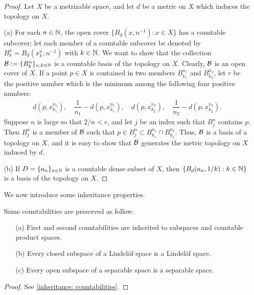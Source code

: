 \begin{proof}
    \hangindent=0.65cm
    Let $X$ be a metrizable space, and let $d$ be a metric on $X$ which induces the topology on $X$.

    \noindent(a)
    For each $n\in{\mathbb{N}}$, the open cover $\{B_d\left(x, n^{-1}\right): x\in X\}$ has a countable subcover; let each member of a countable subcover be denoted by $B_k^n=B_d(x_k^n, n^{-1})$ with $k\in{\mathbb{N}}$.
    We want to show that the collection ${\mathcal{B}}:=\{B_k^n\}_{n, k\in{\mathbb{N}}}$ is a countable basis of the topology on $X$.
    Clearly, ${\mathcal{B}}$ is an open cover of $X$.
    If a point $p\in X$ is contained in two members $B_{k_1}^{n_1}$ and $B_{k_2}^{n_2}$, let $r$ be the positive number which is the minimum among the following four positive numbers:
    \begin{align*}
        d(p, x_{k_1}^{n_1}),\quad\dfrac{1}{n_1}-d(p, x_{k_1}^{n_1}),\quad d(p, x_{k_2}^{n_2}),\quad\dfrac{1}{n_2}-d(p, x_{k_2}^{n_2}).
    \end{align*}
    Suppose $n$ is large so that $2/n<r$, and let $j$ be an index such that $B_j^n$ contains $p$.
    Then $B_j^n$ is a member of ${\mathcal{B}}$ such that $p\in B_j^n\subset B_{k_1}^{n_1}\cap B_{k_2}^{n_2}$.
    Thus, ${\mathcal{B}}$ is a basis of a topology on $X$, and it is easy to show that ${\mathcal{B}}$ generates the metric topology on $X$ induced by $d$.

    \noindent(b)
    If $D=\{a_n\}_{n\in{\mathbb{N}}}$ is a countable dense subset of $X$, then $\{B_d(a_n, 1/k): k\in{\mathbb{N}}\}$ is a basis of the topology on $X$.
\end{proof}

We now introduce some inheritance properties.
\begin{prop}\label{inheritance of countabilities}
    Some countabilities are preserved as follow:
    \begin{enumerate}
        \item[(a)]
        {
            First and second countabilities are inherited to subspaces and countable product spaces.
        }
        \item[(b)]
        {
            Every closed subspace of a Lindel\"{o}f space is a Lindel\"{o}f space.
        }
        \item[(c)]
        {
            Every open subspace of a separable space is a separable space.
        }
    \end{enumerate}
\end{prop}
\begin{proof}
    See \cref{inheritance: countabilities}.
\end{proof}

